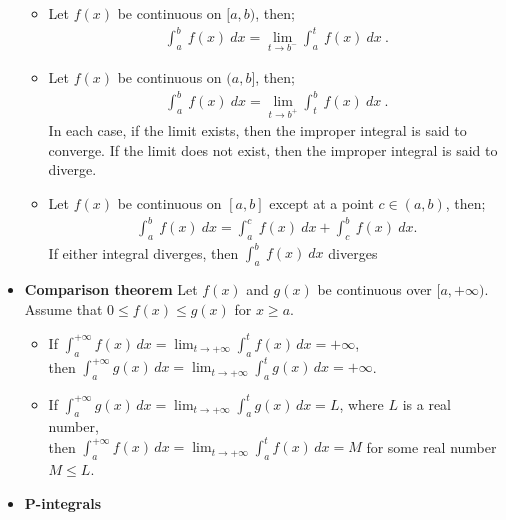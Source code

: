 \documentclass{report}
\begin{document}
\begin{itemize}
\begin{itemize}
                \item Let $f(x)$ be continuous on $[a,b)$, then;
                    \begin{align*}
                        \int_{a}^{b}\ f(x)\ dx = \lim\limits_{t \to b^{-}}{\int_{a}^{t}\ f(x)\ dx}\
                    .\end{align*}
                \item Let $f(x)$ be continuous on $(a,b]$, then;
                    \begin{align*}
                        \int_{a}^{b}\ f(x)\ dx = \lim\limits_{t \to b^{+}}{\int_{t}^{b}\ f(x)\ dx}\
                    .\end{align*}
                    In each case, if the limit exists, then the improper integral is said to converge. If the limit does not exist, then the improper integral is said to diverge.
                \item Let $f(x)$ be continuous on $[a,b]$ except at a point $c \in (a,b)$, then;
                    \begin{align*}
                        \int_{a}^{b}\ f(x)\ dx = \int_{a}^{c}\ f(x)\ dx  +\int_{c}^{b}\ f(x)\ dx
                    .\end{align*}
                    If either integral diverges, then $\int_{a}^{b}\ f(x)\ dx $ diverges
            \end{itemize}
        \item \textbf{Comparison theorem}
            Let $f(x)$ and $g(x)$ be continuous over $[a,+\infty)$. Assume that $0 \leq f(x) \leq g(x)$ for $x \geq a$.
            \begin{itemize}
                \item If $\int_a^{+\infty} f(x) \, dx = \lim_{t \to +\infty} \int_a^t f(x) \, dx = +\infty$,  \\
                    then $\int_a^{+\infty} g(x) \, dx = \lim_{t \to +\infty} \int_a^t g(x) \, dx = +\infty$.
                \item If $\int_a^{+\infty} g(x) \, dx = \lim_{t \to +\infty} \int_a^t g(x) \, dx = L$, where $L$ is a real number,  \\
                    then $\int_a^{+\infty} f(x) \, dx = \lim_{t \to +\infty} \int_a^t f(x) \, dx = M$ for some real number $M \leq L$.
            \end{itemize}
            \pagebreak \bigbreak \noindent 
        \item \textbf{P-integrals}
            \begin{itemize}

\end{itemize}
\end{itemize}
\end{document}
